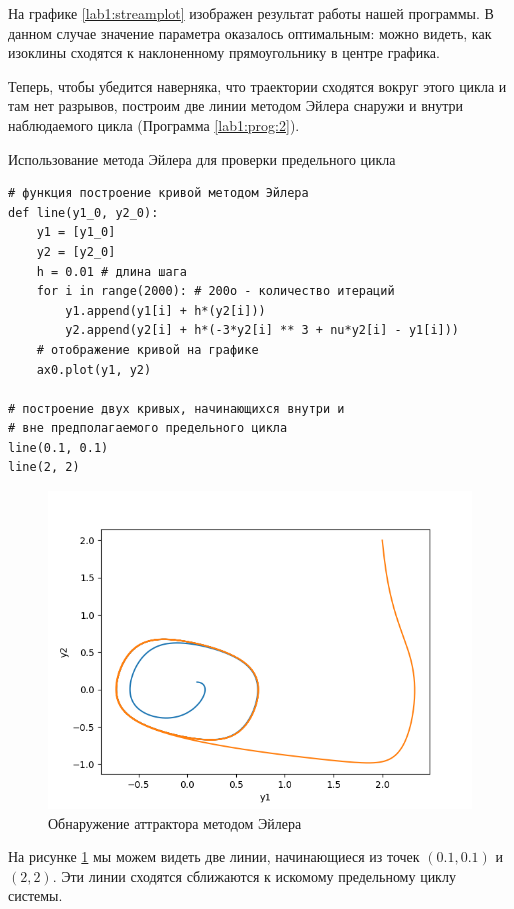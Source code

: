 На графике \ref{lab1:streamplot} изображен результат работы нашей программы.
В данном случае значение параметра оказалось оптимальным: можно видеть, как
изоклины сходятся к наклоненному прямоугольнику в центре графика.

Теперь, чтобы убедится наверняка, что траектории сходятся вокруг этого цикла
и там нет разрывов, построим две линии методом Эйлера снаружи и внутри наблюдаемого
цикла (Программа \ref{lab1:prog:2}).

\begin{program}
  \caption{Использование метода Эйлера для проверки предельного цикла}
  \label{lab1:prog:2}
  \begin{verbatim}
# функция построение кривой методом Эйлера
def line(y1_0, y2_0):
    y1 = [y1_0]
    y2 = [y2_0]
    h = 0.01 # длина шага
    for i in range(2000): # 200o - количество итераций
        y1.append(y1[i] + h*(y2[i]))
        y2.append(y2[i] + h*(-3*y2[i] ** 3 + nu*y2[i] - y1[i]))
    # отображение кривой на графике
    ax0.plot(y1, y2)

# построение двух кривых, начинающихся внутри и
# вне предполагаемого предельного цикла
line(0.1, 0.1)
line(2, 2)
  \end{verbatim}
\end{program}

\clearpage

\begin{figure}[thp]
  \centering
  \includegraphics[width=\textwidth]{figures/1_cycle}
  \caption{Обнаружение аттрактора методом Эйлера}
  \label{lab1:cycle}
\end{figure}

На рисунке \ref{lab1:cycle} мы можем видеть две линии, начинающиеся из точек
$(0.1, 0.1)$ и $(2, 2)$. Эти линии сходятся сближаются к искомому предельному
циклу системы.
